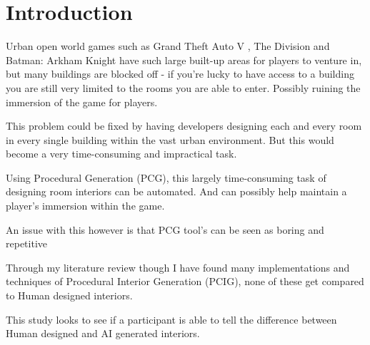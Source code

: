 \section{Introduction}

Urban open world games such as Grand Theft Auto V \cite{game:gta}, The Division \cite{game:division} and Batman: Arkham Knight \cite{game:arkham-knight}
have such large built-up areas for players to venture in, but many buildings are blocked off - 
if you're lucky to have access to a building you are still very limited to the rooms you are able to enter.
Possibly ruining the immersion of the game for players.

This problem could be fixed by having developers designing each and every room in every single building within the vast urban environment.
But this would become a very time-consuming and impractical task.

Using Procedural Generation (PCG), this largely time-consuming task of designing room interiors can be automated. And can possibly help maintain a player's immersion within the game.

An issue with this however is that PCG tool's can be seen as boring and repetitive \cite{pcg_in_gd} 

Through my literature review though I have found many implementations and techniques of Procedural Interior Generation (PCIG), none of these get compared to Human designed interiors. 

This study looks to see if a participant is able to tell the difference between Human designed and AI generated interiors.

